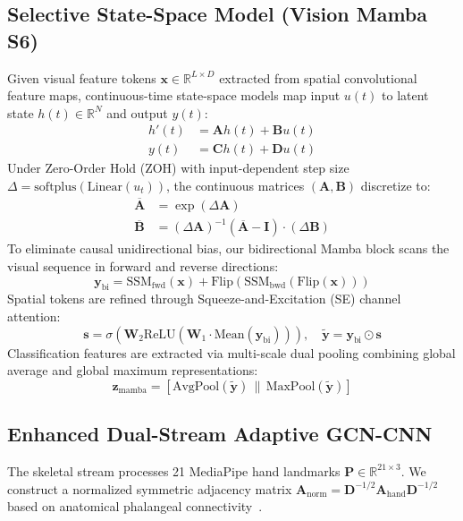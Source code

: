 \documentclass[journal]{IEEEtran}
\begin{document}
\subsection{Selective State-Space Model (Vision Mamba S6)}
Given visual feature tokens $\mathbf{x} \in \mathbb{R}^{L \times D}$ extracted from spatial convolutional feature maps, continuous-time state-space models map input $u(t)$ to latent state $h(t) \in \mathbb{R}^N$ and output $y(t)$:
\begin{align}
    h'(t) &= \mathbf{A} h(t) + \mathbf{B} u(t) \\
    y(t)  &= \mathbf{C} h(t) + \mathbf{D} u(t)
\end{align}
Under Zero-Order Hold (ZOH) with input-dependent step size $\Delta = \text{softplus}(\text{Linear}(u_t))$, the continuous matrices $(\mathbf{A}, \mathbf{B})$ discretize to:
\begin{align}
    \overline{\mathbf{A}} &= \exp(\Delta \mathbf{A}) \\
    \overline{\mathbf{B}} &= (\Delta \mathbf{A})^{-1} (\overline{\mathbf{A}} - \mathbf{I}) \cdot (\Delta \mathbf{B})
\end{align}
To eliminate causal unidirectional bias, our bidirectional Mamba block scans the visual sequence in forward and reverse directions:
\begin{equation}
    \mathbf{y}_{\text{bi}} = \text{SSM}_{\text{fwd}}(\mathbf{x}) + \text{Flip}(\text{SSM}_{\text{bwd}}(\text{Flip}(\mathbf{x})))
\end{equation}
Spatial tokens are refined through Squeeze-and-Excitation (SE) channel attention:
\begin{equation}
    \mathbf{s} = \sigma\left(\mathbf{W}_2 \text{ReLU}(\mathbf{W}_1 \cdot \text{Mean}(\mathbf{y}_{\text{bi}}))\right), \quad \widetilde{\mathbf{y}} = \mathbf{y}_{\text{bi}} \odot \mathbf{s}
\end{equation}
Classification features are extracted via multi-scale dual pooling combining global average and global maximum representations:
\begin{equation}
    \mathbf{z}_{\text{mamba}} = [\text{AvgPool}(\widetilde{\mathbf{y}}) \,\|\, \text{MaxPool}(\widetilde{\mathbf{y}})]
\end{equation}

\subsection{Enhanced Dual-Stream Adaptive GCN-CNN}
The skeletal stream processes 21 MediaPipe hand landmarks $\mathbf{P} \in \mathbb{R}^{21 \times 3}$. We construct a normalized symmetric adjacency matrix $\mathbf{A}_{\text{norm}} = \mathbf{D}^{-1/2} \mathbf{A}_{\text{hand}} \mathbf{D}^{-1/2}$ based on anatomical phalangeal connectivity~\cite{yan2018stgcn}. 
\end{document}
